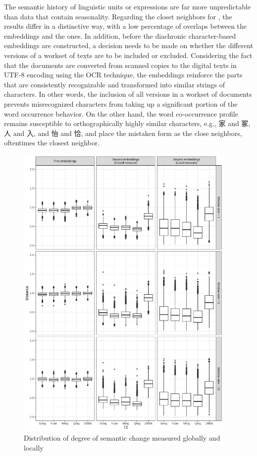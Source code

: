 The semantic history of linguistic units or expressions are far more unpredictable than data that contain seasonality. Regarding the closet neighbors for \jia , the results differ in a distinctive way, with a low percentage of overlaps between the  embeddings and the  ones. In addition, before the diachronic character-based embeddings are constructed, a decision needs to be made on whether the different versions of a workset of texts are to be included or excluded. Considering the fact that the documents are converted from scanned copies to the digital texts in UTF-8 encoding using the OCR technique, the  embeddings reinforce the parts that are consistently recognizable and transformed into similar strings of characters. In other words, the inclusion of all versions in a workset of documents prevents misrecognized characters from taking up a significant portion of the word occurrence behavior. On the other hand, the word co-occurrence profile remains susceptible to orthographically highly similar characters, e.g., 家 and 冢, 人 and 入, and 怡 and 恰, and place the mistaken form as the close neighbors, oftentimes the closest neighbor.

\newpage
\begin{figure}[H]
    \centering
    \includegraphics[width=0.95\textwidth,height=0.95\textheight,keepaspectratio]{figures_new/measures/dist_boxplot.pdf}
    \caption{Distribution of degree of semantic change measured globally and locally}
\end{figure}

